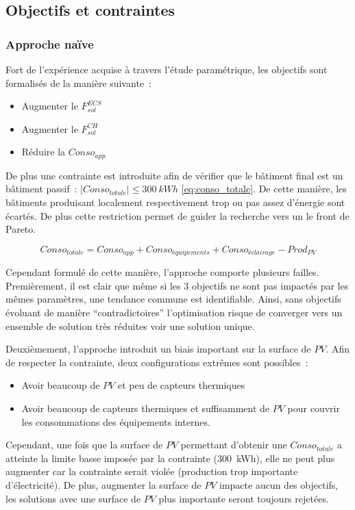 \subsection{Objectifs et contraintes} %
\label{sub:objectifs_et_contraintes}
\subsubsection{Approche naïve} %
\label{ssub:approche_naive}
Fort de l’expérience acquise à travers l’étude paramétrique, les objectifs sont formalisés
de la manière suivante~:
\begin{itemize}
  \item Augmenter le $F_{sol}^{ECS}$
  \item Augmenter le $F_{sol}^{CH}$
  \item Réduire la $Conso_{app}$
\end{itemize}
De plus une contrainte est introduite afin de vérifier que le bâtiment final
est un bâtiment passif~: $|Conso_{totale}| \leq \SI{300}{kWh}$ \eqref{eq:conso_totale}.
De cette manière, les bâtiments produisant localement respectivement trop ou pas assez d’énergie sont
écartés. De plus cette restriction permet de guider la recherche vers un le front de
Pareto.

\begin{equation} \label{eq:conso_totale}
  Conso_{totale} = Conso_{app} + Conso_{équipements} + Conso_{éclairage} - Prod_{PV}
\end{equation}

Cependant formulé de cette manière, l’approche comporte plusieurs failles. Premièrement,
il est clair que même si les \num{3} objectifs ne sont pas impactés par les mêmes
paramètres, une tendance commune est identifiable. Ainsi, sans objectifs évoluant de
manière \enquote{contradictoires} l’optimisation risque de converger vers un ensemble
de solution très réduites voir une solution unique.

Deuxièmement, l’approche introduit un biais important sur la surface de $PV$. Afin de
respecter la contrainte, deux configurations extrêmes sont possibles~:
\begin{itemize}
  \item Avoir beaucoup de $PV$ et peu de capteurs thermiques
  \item Avoir beaucoup de capteurs thermiques et suffisamment de $PV$ pour couvrir
        les consommations des équipements internes.
\end{itemize}
Cependant, une fois que la surface de $PV$ permettant d’obtenir une $Conso_{totale}$
a atteinte la limite basse imposée par la contrainte (\SI{300}{kWh}), elle ne peut plus
augmenter car la contrainte serait violée (production trop importante d’électricité). De plus,
augmenter la surface de $PV$ impacte aucun des objectifs, les solutions avec une surface
de $PV$ plus importante seront toujours rejetées.

